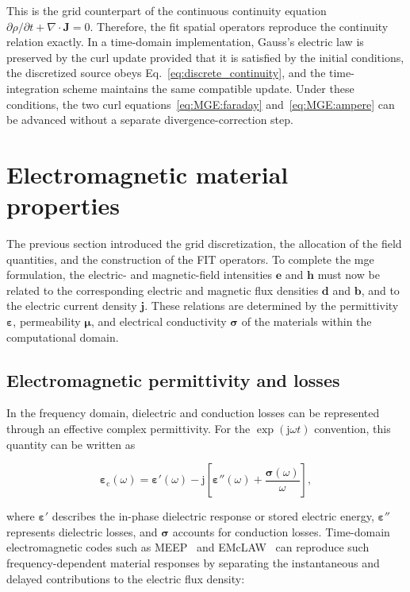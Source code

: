 This is the grid counterpart of the continuous continuity equation $\partial\rho/\partial t+\nabla\cdot\mathbf{J}=0$. Therefore, the \gls{fit} spatial operators reproduce the continuity relation exactly. In a time-domain implementation, Gauss's electric law is preserved by the curl update provided that it is satisfied by the initial conditions, the discretized source obeys Eq.~\eqref{eq:discrete_continuity}, and the time-integration scheme maintains the same compatible update. Under these conditions, the two curl equations~\eqref{eq:MGE:faraday} and~\eqref{eq:MGE:ampere} can be advanced without a separate divergence-correction step.


\section{Electromagnetic material properties}
\label{sec:material_properties}

The previous section introduced the grid discretization, the allocation of the field quantities, and the construction of the FIT operators. To complete the
\gls{mge} formulation, the electric- and magnetic-field intensities
$\mathbf{e}$ and $\mathbf{h}$ must now be related to the corresponding electric and magnetic flux densities $\mathbf{d}$ and $\mathbf{b}$, and to the electric current density $\mathbf{j}$. These relations are determined by the permittivity $\boldsymbol{\varepsilon}$, permeability $\boldsymbol{\mu}$, and electrical conductivity $\boldsymbol{\sigma}$ of the materials within the computational domain.

\subsection{ Electromagnetic permittivity and losses}
In the frequency domain, dielectric and conduction losses can be represented through an effective complex permittivity. For the $\exp(\mathrm{j}\omega t)$ convention, this quantity can be written as

\begin{equation}
\boldsymbol{\varepsilon}_{\mathrm{c}}(\omega)
=
\boldsymbol{\varepsilon}'(\omega)
-
\mathrm{j}
\left[
\boldsymbol{\varepsilon}''(\omega)
+
\frac{\boldsymbol{\sigma}(\omega)}{\omega}
\right],
\label{eq:complex_permittivity}
\end{equation}

where $\boldsymbol{\varepsilon}'$ describes the in-phase dielectric response or stored electric energy, $\boldsymbol{\varepsilon}''$ represents dielectric losses, and $\boldsymbol{\sigma}$ accounts for conduction losses. Time-domain electromagnetic codes such as MEEP~\cite{oskooi_meep_2010} and EMcLAW~\cite{moreno_emclaw_2021} can reproduce such frequency-dependent material responses by separating the instantaneous and delayed contributions to the electric flux density:

